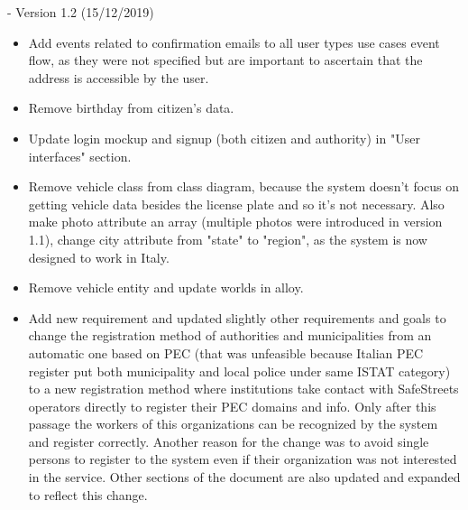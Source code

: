 - Version 1.2 (15/12/2019)
\begin{itemize}
	\item Add events related to confirmation emails to all user types use cases event flow, as they were not specified but are important to ascertain that the address is accessible by the user.
	\item Remove birthday from citizen's data.
	\item Update login mockup and signup (both citizen and authority) in "User interfaces" section.
	\item Remove vehicle class from class diagram, because the system doesn't focus on getting vehicle data besides the license plate and so it's not necessary. Also make photo attribute an array (multiple photos were introduced in version 1.1), change city attribute from "state" to "region", as the system is now designed to work in Italy.
	\item Remove vehicle entity and update worlds in alloy.
	\item Add new requirement and updated slightly other requirements and goals to change the registration method of authorities and municipalities from an automatic one based on PEC (that was unfeasible because Italian PEC register put both municipality and local police under same ISTAT category) to a new registration method where institutions take contact with SafeStreets operators directly to register their PEC domains and info. Only after this passage the workers of this organizations can be recognized by the system and register correctly. Another reason for the change was to avoid single persons to register to the system even if their organization was not interested in the service. Other sections of the document are also updated and expanded to reflect this change.
\end{itemize}